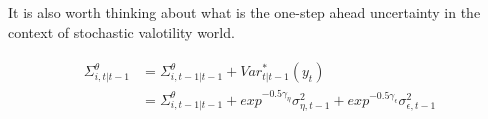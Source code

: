 \documentclass[]{article}
\begin{document}
It is also worth thinking about what is the one-step ahead uncertainty in the context of stochastic valotility world. 


\begin{eqnarray}
\begin{split}
\Sigma^\theta_{i,t|t-1} & = \Sigma^\theta_{i,t-1|t-1} + Var^*_{t|t-1}(y_t) \\
& = \Sigma^\theta_{i,t-1|t-1} +  exp^{- 0.5\gamma_{\eta}} \sigma^2_{\eta,t-1}  +  exp^{- 0.5\gamma_{\epsilon}} \sigma^2_{\epsilon,t-1} 
\end{split}
\end{eqnarray}
\end{document}
